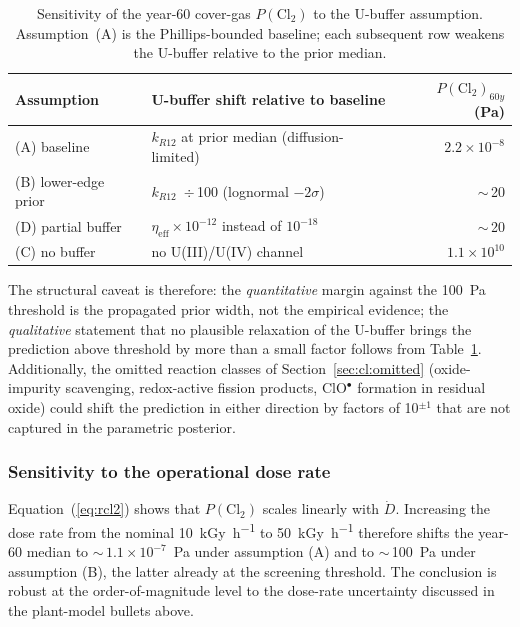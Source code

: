 \documentclass[11pt]{article}
\theoremstyle{plain}
\theoremstyle{definition}
\theoremstyle{remark}
\begin{document}
\begin{table}[h!]
\centering
\caption{Sensitivity of the year-60 cover-gas $P(\mathrm{Cl}_2)$ to the
U-buffer assumption.  Assumption~(A) is the Phillips-bounded baseline;
each subsequent row weakens the U-buffer relative to the prior median.}
\label{tab:ubuffer-sens}
\small
\begin{tabular}{llr}
\toprule
Assumption & U-buffer shift relative to baseline & $P(\mathrm{Cl_2})_{60y}$ (Pa) \\
\midrule
(A) baseline & $k_{R12}$ at prior median (diffusion-limited) & $2.2\!\times\!10^{-8}$ \\
(B) lower-edge prior & $k_{R12}$ \,$\div$\,100 (lognormal $-2\sigma$) & $\sim$\,20 \\
(D) partial buffer & $\eta_{\mathrm{eff}}\!\times\!10^{-12}$ instead of $10^{-18}$ & $\sim$\,20 \\
(C) no buffer & no U(III)/U(IV) channel & $1.1\!\times\!10^{10}$ \\
\bottomrule
\end{tabular}
\end{table}

The structural caveat is therefore: the \emph{quantitative} margin
against the \SI{100}{\pascal} threshold is the propagated prior width,
not the empirical evidence; the \emph{qualitative} statement that no
plausible relaxation of the U-buffer brings the prediction above
threshold by more than a small factor follows from
Table~\ref{tab:ubuffer-sens}.  Additionally, the omitted reaction classes
of Section~\ref{sec:cl:omitted} (oxide-impurity scavenging, redox-active
fission products, ClO$^{\bullet}$ formation in residual oxide) could
shift the prediction in either direction by factors of 10$^{\pm1}$ that
are not captured in the parametric posterior.

\subsubsection{Sensitivity to the operational dose rate}\label{sec:op:mcfr:doserate}

Equation~(\ref{eq:rcl2}) shows that $P(\mathrm{Cl}_2)$ scales linearly
with $\dot D$.  Increasing the dose rate from the nominal
\SI{10}{\kilo\gray\per\hour} to \SI{50}{\kilo\gray\per\hour} therefore
shifts the year-60 median to $\sim$\,$1.1\!\times\!10^{-7}$~Pa under
assumption (A) and to $\sim$\,100~Pa under assumption (B), the latter
already at the screening threshold.  The conclusion is robust at the
order-of-magnitude level to the dose-rate uncertainty discussed in the
plant-model bullets above.
\end{document}
